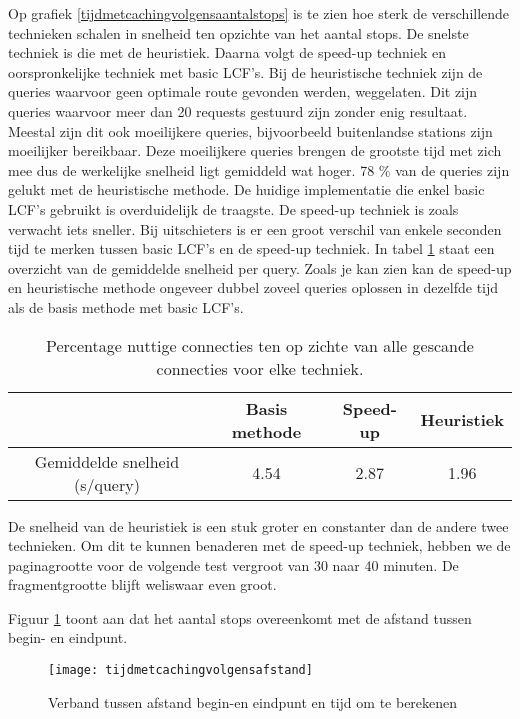 Op grafiek \ref{tijdmetcachingvolgensaantalstops} is te zien hoe sterk de verschillende technieken schalen in snelheid ten opzichte van het aantal stops. 
De snelste techniek is die met de heuristiek. Daarna volgt de speed-up techniek en oorspronkelijke techniek met basic LCF's. Bij de heuristische techniek zijn de queries waarvoor geen optimale route gevonden werden, weggelaten. Dit zijn queries waarvoor meer dan 20 requests gestuurd zijn zonder enig resultaat. Meestal zijn dit ook moeilijkere queries, bijvoorbeeld buitenlandse stations zijn moeilijker bereikbaar. Deze moeilijkere queries brengen de grootste tijd met zich mee dus de werkelijke snelheid ligt gemiddeld wat hoger. 78 \% van de queries zijn gelukt met de heuristische methode.
De huidige implementatie die enkel basic LCF's gebruikt is overduidelijk de traagste. De speed-up techniek is zoals verwacht iets sneller. Bij uitschieters is er een groot verschil van enkele seconden tijd te merken tussen basic LCF's en de speed-up techniek. In tabel \ref{table:gemiddeldesnelheid} staat een overzicht van de gemiddelde snelheid per query. Zoals je kan zien kan de speed-up en heuristische methode ongeveer dubbel zoveel queries oplossen in dezelfde tijd als de basis methode met basic LCF's.
\begin{table}[htbp]
\centering
\begin{tabular}{ | c || c | c | c | }
 &  Basis methode & Speed-up & Heuristiek \\ \hline
  Gemiddelde snelheid (s/query) & 4.54 & 2.87 & 1.96 \\
\hline
\end{tabular}
\caption{Percentage nuttige connecties ten op zichte van alle gescande connecties voor elke techniek.}
\label{table:gemiddeldesnelheid}
\end{table}

De snelheid van de heuristiek is een stuk groter en constanter dan de andere twee technieken. Om dit te kunnen benaderen met de speed-up techniek, hebben we de paginagrootte voor de volgende test vergroot van 30 naar 40 minuten. De fragmentgrootte blijft weliswaar even groot.

Figuur \ref{tijdmetcachingvolgensafstand} toont aan dat het aantal stops overeenkomt met de afstand tussen begin- en eindpunt.

\begin{figure}[h!]
\centering
\texttt{[image: tijdmetcachingvolgensafstand]}
\caption{Verband tussen afstand begin-en eindpunt en tijd om te berekenen}
\label{tijdmetcachingvolgensafstand}
\end{figure}

